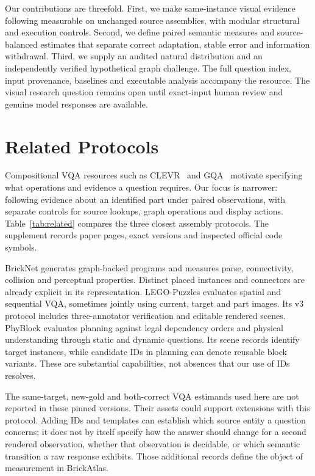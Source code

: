 \documentclass[10pt,twocolumn,letterpaper]{article}
\begin{document}
Our contributions are threefold. First, we make same-instance visual
evidence following measurable on unchanged source assemblies, with
modular structural and execution controls. Second, we define paired
semantic measures and source-balanced estimates that separate
correct adaptation, stable error and information withdrawal.
Third, we supply an audited natural distribution and an independently
verified hypothetical graph challenge. The full question index,
input provenance, baselines and executable analysis accompany the
resource. The visual research question remains open until exact-input
human review and genuine model responses are available.

\section{Related Protocols}

Compositional VQA resources such as CLEVR~\cite{johnson2017clevr} and
GQA~\cite{hudson2019gqa} motivate specifying what operations and evidence
a question requires. Our focus is narrower: following evidence about
an identified part under paired observations, with separate controls
for source lookups, graph operations and display actions.
Table~\ref{tab:related} compares the three closest assembly protocols.
The supplement records paper pages, exact versions and inspected
official code symbols.

BrickNet generates graph-backed programs and measures parse,
connectivity, collision and perceptual properties. Distinct placed
instances and connectors are already explicit in its representation.
LEGO-Puzzles evaluates spatial and sequential VQA, sometimes jointly
using current, target and part images. Its v3 protocol includes
three-annotator verification and editable rendered scenes.
PhyBlock evaluates planning against legal dependency orders and
physical understanding through static and dynamic questions. Its scene
records identify target instances, while candidate IDs in planning
can denote reusable block variants. These are substantial capabilities,
not absences that our use of IDs resolves.

The same-target, new-gold and both-correct VQA estimands used here are
not reported in these pinned versions. Their assets could support
extensions with this protocol. Adding IDs and templates can establish
which source entity a question concerns; it does not by itself specify
how the answer should change for a second rendered observation,
whether that observation is decidable, or which semantic transition a
raw response exhibits. Those additional records define the object of
measurement in BrickAtlas.
\end{document}
